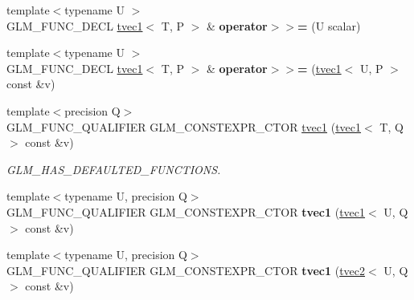 \begin{DoxyCompactItemize}
\mbox{\label{structglm_1_1tvec1_ae9110ae99e82eba81f9b347c8b4f7f77}} 
{\footnotesize template$<$typename U $>$ }\\G\+L\+M\+\_\+\+F\+U\+N\+C\+\_\+\+D\+E\+CL \hyperlink{structglm_1_1tvec1}{tvec1}$<$ T, P $>$ \& {\bfseries operator$>$$>$=} (U scalar)
\item 
\mbox{\label{structglm_1_1tvec1_ac7b30c3a71fc6b28c4bceae5a0e92057}} 
{\footnotesize template$<$typename U $>$ }\\G\+L\+M\+\_\+\+F\+U\+N\+C\+\_\+\+D\+E\+CL \hyperlink{structglm_1_1tvec1}{tvec1}$<$ T, P $>$ \& {\bfseries operator$>$$>$=} (\hyperlink{structglm_1_1tvec1}{tvec1}$<$ U, P $>$ const \&v)
\item 
\mbox{\label{structglm_1_1tvec1_a3fa1c02ae48daf7eec33fa1f8ce1661f}} 
{\footnotesize template$<$precision Q$>$ }\\G\+L\+M\+\_\+\+F\+U\+N\+C\+\_\+\+Q\+U\+A\+L\+I\+F\+I\+ER G\+L\+M\+\_\+\+C\+O\+N\+S\+T\+E\+X\+P\+R\+\_\+\+C\+T\+OR \hyperlink{structglm_1_1tvec1_a3fa1c02ae48daf7eec33fa1f8ce1661f}{tvec1} (\hyperlink{structglm_1_1tvec1}{tvec1}$<$ T, Q $>$ const \&v)
\begin{DoxyCompactList}\small\item\em G\+L\+M\+\_\+\+H\+A\+S\+\_\+\+D\+E\+F\+A\+U\+L\+T\+E\+D\+\_\+\+F\+U\+N\+C\+T\+I\+O\+NS. \end{DoxyCompactList}\item 
\mbox{\label{structglm_1_1tvec1_a87b45be425c692be0ff12e600c741d9c}} 
{\footnotesize template$<$typename U, precision Q$>$ }\\G\+L\+M\+\_\+\+F\+U\+N\+C\+\_\+\+Q\+U\+A\+L\+I\+F\+I\+ER G\+L\+M\+\_\+\+C\+O\+N\+S\+T\+E\+X\+P\+R\+\_\+\+C\+T\+OR {\bfseries tvec1} (\hyperlink{structglm_1_1tvec1}{tvec1}$<$ U, Q $>$ const \&v)
\item 
\mbox{\label{structglm_1_1tvec1_add32615332f25e7cc5abc5f34b57efc4}} 
{\footnotesize template$<$typename U, precision Q$>$ }\\G\+L\+M\+\_\+\+F\+U\+N\+C\+\_\+\+Q\+U\+A\+L\+I\+F\+I\+ER G\+L\+M\+\_\+\+C\+O\+N\+S\+T\+E\+X\+P\+R\+\_\+\+C\+T\+OR {\bfseries tvec1} (\hyperlink{structglm_1_1tvec2}{tvec2}$<$ U, Q $>$ const \&v)
\item 
\mbox{\label{structglm_1_1tvec1_a39a04679b7f07e1e629c77a6f86a969e}} 

\end{DoxyCompactItemize}
